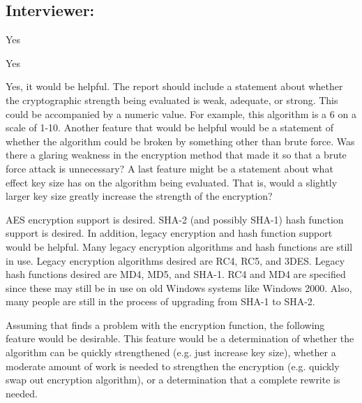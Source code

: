 \subsection{Interviewer: \dd}


\begin{answer}{1}
Yes
\end{answer}


\begin{answer}{2}
Yes
\end{answer}


\begin{answer}{3}
Yes, it would be helpful.
   The report should include a statement about whether the cryptographic strength being evaluated is weak, adequate, or strong. This could be accompanied by a numeric value. For example, this algorithm is a 6 on a scale of 1-10.
   Another feature that would be helpful would be a statement of whether the algorithm could be broken by something other than brute force. Was there a glaring weakness in the encryption method that made it so that a brute force attack is unnecessary?
   A last feature might be a statement about what effect key size has on the algorithm being evaluated. That is, would a slightly larger key size greatly increase the strength of the encryption?
\end{answer}


\begin{answer}{4}
AES encryption support is desired. SHA-2 (and possibly SHA-1) hash function support is desired. In addition, legacy encryption and hash function support would be helpful. Many legacy encryption algorithms and hash functions are still in use. Legacy encryption algorithms desired are RC4, RC5, and 3DES. Legacy hash functions desired are MD4, MD5, and SHA-1. RC4 and MD4 are specified since these may still be in use on old Windows systems like Windows 2000. Also, many people are still in the process of upgrading from SHA-1 to SHA-2.
\end{answer}


\begin{answer}{5}
Assuming that \cry{} finds a problem with the encryption function, the following feature would be desirable. This feature would be a determination of whether the algorithm can be quickly strengthened (e.g. just increase key size), whether a moderate amount of work is needed to strengthen the encryption (e.g. quickly swap out encryption algorithm), or a determination that a complete rewrite is needed.
\end{answer}


